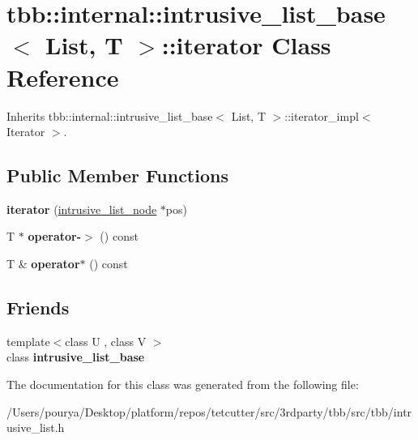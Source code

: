 \hypertarget{classtbb_1_1internal_1_1intrusive__list__base_1_1iterator}{}\section{tbb\+:\+:internal\+:\+:intrusive\+\_\+list\+\_\+base$<$ List, T $>$\+:\+:iterator Class Reference}
\label{classtbb_1_1internal_1_1intrusive__list__base_1_1iterator}


Inherits tbb\+::internal\+::intrusive\+\_\+list\+\_\+base$<$ List, T $>$\+::iterator\+\_\+impl$<$ Iterator $>$.

\subsection*{Public Member Functions}
\begin{DoxyCompactItemize}
\item 
\hypertarget{classtbb_1_1internal_1_1intrusive__list__base_1_1iterator_aa6bb016ce0a395e36b48ed001c17052e}{}{\bfseries iterator} (\hyperlink{structtbb_1_1internal_1_1intrusive__list__node}{intrusive\+\_\+list\+\_\+node} $\ast$pos)\label{classtbb_1_1internal_1_1intrusive__list__base_1_1iterator_aa6bb016ce0a395e36b48ed001c17052e}

\item 
\hypertarget{classtbb_1_1internal_1_1intrusive__list__base_1_1iterator_a8ac19ccd3169934209d379f5321b300e}{}T $\ast$ {\bfseries operator-\/$>$} () const \label{classtbb_1_1internal_1_1intrusive__list__base_1_1iterator_a8ac19ccd3169934209d379f5321b300e}

\item 
\hypertarget{classtbb_1_1internal_1_1intrusive__list__base_1_1iterator_a7e635695b46109c2ec5d18c67a1d54cf}{}T \& {\bfseries operator$\ast$} () const \label{classtbb_1_1internal_1_1intrusive__list__base_1_1iterator_a7e635695b46109c2ec5d18c67a1d54cf}

\end{DoxyCompactItemize}
\subsection*{Friends}
\begin{DoxyCompactItemize}
\item 
\hypertarget{classtbb_1_1internal_1_1intrusive__list__base_1_1iterator_a5162ab97d8ee5edd5a81f3f60aaf758c}{}{\footnotesize template$<$class U , class V $>$ }\\class {\bfseries intrusive\+\_\+list\+\_\+base}\label{classtbb_1_1internal_1_1intrusive__list__base_1_1iterator_a5162ab97d8ee5edd5a81f3f60aaf758c}

\end{DoxyCompactItemize}


The documentation for this class was generated from the following file\+:\begin{DoxyCompactItemize}
\item 
/\+Users/pourya/\+Desktop/platform/repos/tetcutter/src/3rdparty/tbb/src/tbb/intrusive\+\_\+list.\+h\end{DoxyCompactItemize}
